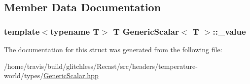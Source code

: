 \subsection{Member Data Documentation}
\hypertarget{struct_generic_scalar_a27d311e2bdb13149160fa258d46bcfe3}{
\subsubsection[{\-\_\-value}]{\setlength{\rightskip}{0pt plus 5cm}template$<$typename T$>$ T {\bf Generic\-Scalar}$<$ T $>$\-::\-\_\-value\hspace{0.3cm}{\ttfamily [protected]}}}\label{struct_generic_scalar_a27d311e2bdb13149160fa258d46bcfe3}


The documentation for this struct was generated from the following file\-:\begin{DoxyCompactItemize}
\item 
/home/travis/build/glitchless/\-Recast/src/headers/temperature-\/world/types/\hyperlink{_generic_scalar_8hpp}{Generic\-Scalar.\-hpp}\end{DoxyCompactItemize}
